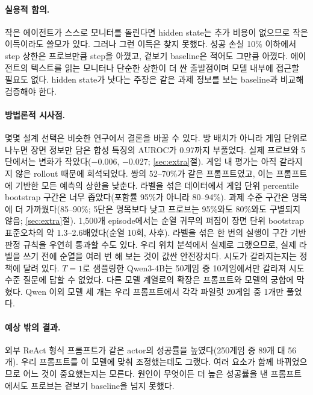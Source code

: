 \documentclass[11pt]{article}
\begin{document}
\paragraph{실용적 함의.} 작은 에이전트가 스스로 모니터를 돌린다면 hidden state는 추가 비용이 없으므로 작은 이득이라도 쓸모가 있다. 그러나 그런 이득은 찾지 못했다. 성공 손실 10\% 이하에서 step 상한은 프로브만큼 step을 아꼈고, 겉보기 baseline은 적어도 그만큼 아꼈다.
에이전트의 텍스트를 읽는 모니터나 단순한 상한이 더 싼 출발점이며 모델 내부에 접근할 필요도 없다. hidden state가 낫다는 주장은 같은 과제 정보를 보는 baseline과 비교해 검증해야 한다.

\paragraph{방법론적 시사점.} 몇몇 설계 선택은 비슷한 연구에서 결론을 바꿀 수 있다. 방 배치가 아니라 게임 단위로 나누면 장면 정보만 담은 합성 특징의 AUROC가 0.97까지 부풀었다. 실제 프로브와 5단에서는 변화가 작았다($-0.006$, $-0.027$; \ref{sec:extra}절).
게임 내 평가는 아직 갈라지지 않은 rollout 때문에 희석되었다. 쌍의 52--70\%가 같은 프롬프트였고, 이는 프롬프트에 기반한 모든 예측의 상한을 낮춘다. 라벨을 섞은 데이터에서 게임 단위 percentile bootstrap 구간은 너무 좁았다(포함률 95\%가 아니라 80--94\%). 과제 수준 구간은 명목에 더 가까웠다(85--90\%; 5단은 명목보다 낮고 프로브는 95\%와도 80\%와도 구별되지 않음; \ref{sec:extra}절). 1,500개 episode에서는 순열 귀무의 퍼짐이 장면 단위 bootstrap 표준오차의 약 1.3--2.6배였다(순열 10회, 사후). 라벨을 섞은 한 번의 실행이 구간 기반 판정 규칙을 우연히 통과할 수도 있다. 우리 위치 분석에서 실제로 그랬으므로, 실제 라벨을 쓰기 전에 순열을 여러 번 해 보는 것이 값싼 안전장치다.
시도가 갈라지는지는 정책에 달려 있다. $T = 1$로 샘플링한 Qwen3-4B는 50게임 중 10게임에서만 갈라져 시도 수준 질문에 답할 수 없었다. 다른 모델 계열로의 확장은 프롬프트와 모델의 궁합에 막혔다. Qwen 이외 모델 세 개는 우리 프롬프트에서 각각 파일럿 20게임 중 1개만 풀었다.

\paragraph{예상 밖의 결과.} 외부 ReAct 형식 프롬프트가 같은 actor의 성공률을 높였다(250게임 중 89개 대 56개). 우리 프롬프트를 이 모델에 맞춰 조정했는데도 그랬다. 여러 요소가 함께 바뀌었으므로 어느 것이 중요했는지는 모른다. 원인이 무엇이든 더 높은 성공률을 낸 프롬프트에서도 프로브는 겉보기 baseline을 넘지 못했다.
\end{document}
